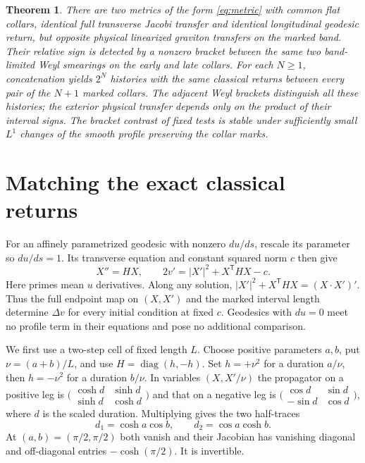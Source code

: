 \documentclass[11pt]{article}
\newtheorem{theorem}{Theorem}
\begin{document}
\begin{theorem}
There are two metrics of the form \eqref{eq:metric} with common flat collars, identical full transverse Jacobi transfer and identical longitudinal geodesic return, but opposite physical linearized graviton transfers on the marked band. Their relative sign is detected by a nonzero bracket between the same two band-limited Weyl smearings on the early and late collars. For each $N\ge1$, concatenation yields $2^N$ histories with the same classical returns between every pair of the $N+1$ marked collars. The adjacent Weyl brackets distinguish all these histories; the exterior physical transfer depends only on the product of their interval signs. The bracket contrast of fixed tests is stable under sufficiently small $L^1$ changes of the smooth profile preserving the collar marks.
\end{theorem}

\section{Matching the exact classical returns}
For an affinely parametrized geodesic with nonzero $du/ds$, rescale its parameter so $du/ds=1$. Its transverse equation and constant squared norm $c$ then give
\[
 X''=H X,\qquad
 2v'=|X'|^2+X^\mathsf{T}HX-c.
\]
Here primes mean $u$ derivatives. Along any solution,
$|X'|^2+X^\mathsf{T}HX=(X\cdot X')'$. Thus the full endpoint map on $(X,X')$ and the marked interval length determine $\Delta v$ for every initial condition at fixed $c$. Geodesics with $du=0$ meet no profile term in their equations and pose no additional comparison.

We first use a two-step cell of fixed length $L$. Choose positive parameters $a,b$, put $\nu=(a+b)/L$, and use $H=\operatorname{diag}(h,-h)$. Set $h=+\nu^2$ for a duration $a/\nu$, then $h=-\nu^2$ for a duration $b/\nu$. In variables $(X,X'/\nu)$ the propagator on a positive leg is
$\bigl(\begin{smallmatrix}\cosh d&\sinh d\\\sinh d&\cosh d\end{smallmatrix}\bigr)$
and that on a negative leg is
$\bigl(\begin{smallmatrix}\cos d&\sin d\\-\sin d&\cos d\end{smallmatrix}\bigr)$,
where $d$ is the scaled duration. Multiplying gives the two half-traces
\[
 d_1=\cosh a\cos b,\qquad d_2=\cos a\cosh b.
\]
At $(a,b)=(\pi/2,\pi/2)$ both vanish and their Jacobian has vanishing diagonal and off-diagonal entries $-\cosh(\pi/2)$. It is invertible.
\end{document}
